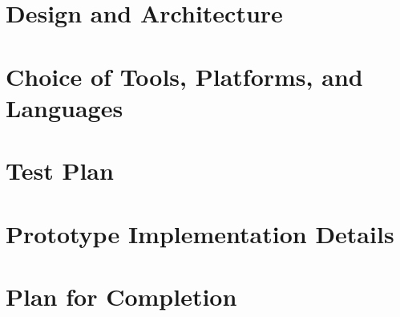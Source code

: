 \documentclass{scrreprt}
\begin{document}






\chapter{Design and Architecture}






\chapter {Choice of Tools, Platforms, and Languages}




\chapter{Test Plan}




\chapter{Prototype Implementation Details}




\chapter{Plan for Completion}
\end{document}
